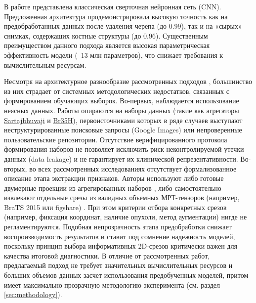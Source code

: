 \documentclass[eqsecnum, authorsinfo]{kioj6}
\begin{document}


В работе \cite{5} представлена классическая сверточная нейронная сеть (CNN). Предложенная архитектура продемонстрировала высокую точность как на 
предобработанных данных после удаления черепа (до 0.99), так и на «сырых» снимках, содержащих костные структуры (до 0.96). 
Существенным преимуществом данного подхода является высокая параметрическая эффективность модели (~13 млн параметров), что снижает требования к вычислительным ресурсам.

Несмотря на архитектурное разнообразие рассмотренных подходов \cite{1,2,3,4,5}, большинство из них страдает от системных методологических недостатков, связанных с формированием обучающих выборок. Во-первых, наблюдается использование неясных данных. Работы \cite{1,3,4} опираются на наборы данных (такие как агрегаторы \href{https://www.kaggle.com/datasets/sartajbhuvaji/brain-tumor-classification-mri/data}{Sartajbhuvaji} и \href{https://www.kaggle.com/datasets/navoneel/brain-mri-images-for-brain-tumor-detection/data}{Br35H}), первоисточниками которых в ряде случаев выступают неструктурированные поисковые запросы (Google Images) или непроверенные пользовательские репозитории. Отсутствие верифицированного протокола формирования наборов не позволяет исключить риск неконтролируемой утечки данных (data leakage) и не гарантирует их клинической репрезентативности. 
Во-вторых, во всех рассмотренных исследованиях \cite{1,2,3,4,5} отсутствует формализованное описание этапа экстракции признаков. Авторы используют либо готовые двумерные проекции из агрегированных наборов \cite{1,3,4}, либо самостоятельно извлекают отдельные срезы из валидных объемных МРТ-тензоров (например, BraTS 2015 или figshare) \cite{2,5}. При этом критерии отбора конкретных срезов (например, фиксация координат, наличие опухоли, метод аугментации) нигде не регламентируются. Подобная непрозрачность этапа предобработки снижает воспроизводимость результатов и ставит под сомнение надежность моделей, поскольку принцип выбора информативных 2D-срезов критически важен для качества итоговой диагностики. 
В отличие от рассмотренных работ, предлагаемый подход не требует значительных вычислительных ресурсов и больших объемов данных засчет использования 
предобученных моделей, притом имеет максимально прозрачную методологию эксперимента (см. раздел \ref{sec:methodology}).
\end{document}
